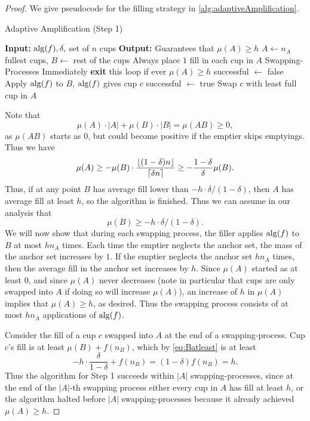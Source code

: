 \begin{proof}
  We give pseudocode for the filling strategy in
  \cref{alg:adaptiveAmplification}.

\begin{algorithm}
  \caption{Adaptive Amplification (Step 1)}
  \label{alg:adaptiveAmplification}
  \begin{algorithmic}
    \State \textbf{Input:} $\operatorname{\text{\textup{alg}}}(f), \delta, $ set of $n$ cups
    \State \textbf{Output:} Guarantees that $\mu(A) \ge h$
    \State
    \State $A \gets n_A$ fullest cups, $B \gets $ rest of the cups
    \State Always place $1$ fill in each cup in $A$
     \Comment Swapping-Processes
    \State Immediately \textbf{exit} this loop if ever $\mu(A) \ge h$ 
      \State successful $\gets $ false
      \State Apply $\operatorname{\text{\textup{alg}}}(f)$ to $B$, $\operatorname{\text{\textup{alg}}}(f)$ gives cup $c$
          \State successful $\gets$ true
        \EndIf
      \EndWhile
      \State Swap $c$ with least full cup in $A$
    \EndWhile
  \end{algorithmic}
\end{algorithm}
  
  Note that $$\mu(A) \cdot |A| + \mu(B)\cdot |B| = \mu(AB) \ge 0,$$
  as $\mu(AB)$ starts as $0$, but could become positive if the
  emptier skips emptyings.
  Thus we have 
  $$\mu(A) \ge - \mu(B) \cdot
  \frac{\left\lfloor (1-\delta)n \right\rfloor}{\left\lceil \delta n \right\rceil} \ge -
  \frac{1-\delta}{\delta} \mu(B).$$ Thus, if at any
  point $B$ has average fill lower than $-h \cdot
  \delta/(1-\delta)$, then $A$ has average fill at least $h$, so
  the algorithm is finished. Thus we can assume in our analysis that
  \begin{equation}
    \mu(B) \ge -h\cdot\delta/(1-\delta).
  \label{eq:Batleast}
  \end{equation}
  We will now show that during each swapping process, the filler
  applies $\operatorname{\text{\textup{alg}}}(f)$ to $B$ at most $h n_A$ times. 
  Each time the emptier neglects the anchor set, the mass of the
  anchor set increases by $1$. If the emptier neglects the anchor set $h
  n_A$ times, then the average fill in the anchor set increases by
  $h$. Since $\mu(A)$ started as at least $0$, and
  since $\mu(A)$ never decreases (note in particular that cups are only
  swapped into $A$ if doing so will increase $\mu(A)$), an
  increase of $h$ in $\mu(A)$ implies that $\mu(A) \ge h$, as
  desired. Thus the swapping process consists of at most
  $h n_A$ applications of $\operatorname{\text{\textup{alg}}}(f)$.  

  Consider the fill of a cup $c$ swapped into $A$ at the end of a
  swapping-process. Cup $c$'s fill is at least $\mu(B) + f(n_B)$,
  which by \eqref{eq:Batleast} is at least
  $$-h \cdot \frac{\delta}{1-\delta} + f(n_B) = (1-\delta)f(n_B) = h.$$ 
  Thus the algorithm for Step 1 succeeds within $|A|$
  swapping-processes, since at the end of the $|A|$-th swapping
  process either every cup in $A$ has fill at least $h$, or the
  algorithm halted before $|A|$ swapping-processes because it
  already achieved $\mu(A) \ge h$. 
  

\end{proof}
